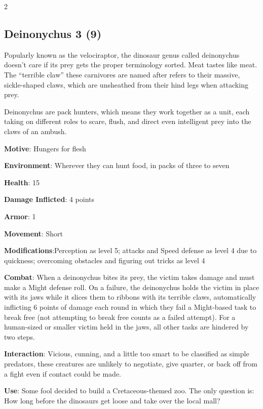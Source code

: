 \begin{multicols}{2}
\subsection{Deinonychus	3 (9)}

Popularly known as the velociraptor, the dinosaur genus called deinonychus doesn’t care if its prey gets the proper terminology sorted. Meat tastes like meat. The “terrible claw” these carnivores are named after refers to their massive, sickle-shaped claws, which are unsheathed from their hind legs when attacking prey.

Deinonychus are pack hunters, which means they work together as a unit, each taking on different roles to scare, flush, and direct even intelligent prey into the claws of an ambush.

\textbf{Motive}: Hungers for flesh

\textbf{Environment}: Wherever they can hunt food, in packs of three to seven 

\textbf{Health}: 15

\textbf{Damage Inflicted}: 4 points

\textbf{Armor}: 1

\textbf{Movement}: Short

\textbf{Modifications}:Perception as level 5; attacks and Speed defense as level 4 due to quickness; overcoming obstacles and figuring out tricks as level 4

\textbf{Combat}: When a deinonychus bites its prey, the victim takes damage and must make a Might defense roll. On a failure, the deinonychus holds the victim in place with its jaws while it slices them to ribbons with its terrible claws, automatically inflicting 6 points of damage each round in which they fail a Might-based task to break free (not attempting to break free counts as a failed attempt). For a human-sized or smaller victim held in the jaws, all other tasks are hindered by two steps.

\textbf{Interaction}: Vicious, cunning, and a little too smart to be classified as simple predators, these creatures are unlikely to negotiate, give quarter, or back off from a fight even if contact could be made.

\textbf{Use}: Some fool decided to build a Cretaceous-themed zoo. The only question is: How long before the dinosaurs get loose and take over the local mall?


\end{multicols}
